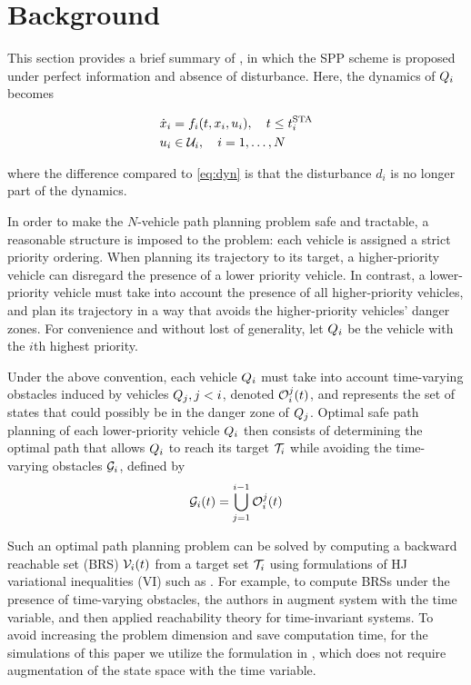 \section{Background \label{sec:background}}
This section provides a brief summary of \cite{Chen15}, in which the SPP scheme is proposed under perfect information and absence of disturbance. Here, the dynamics of $Q_i$ becomes

\begin{equation}
\label{eq:dyn_no_dstb}
\begin{aligned}
\dot{x}_i &= f_i(t, x_i, u_i), \quad t \le t^\text{STA}_i \\
u_i &\in \mathcal{U}_i, \quad i = 1,\ldots, N
\end{aligned}
\end{equation}

\noindent where the difference compared to \eqref{eq:dyn} is that the disturbance $d_i$ is no longer part of the dynamics.

In order to make the $N$-vehicle path planning problem safe and tractable, a reasonable structure is imposed to the problem: each vehicle is assigned a strict priority ordering. When planning its trajectory to its target, a higher-priority vehicle can disregard the presence of a lower priority vehicle. In contrast, a lower-priority vehicle must take into account the presence of all higher-priority vehicles, and plan its trajectory in a way that avoids the higher-priority vehicles' danger zones. For convenience and without lost of generality, let $Q_i$ be the vehicle with the $i$th highest priority. 

Under the above convention, each vehicle $Q_i$ must take into account time-varying obstacles induced by vehicles $Q_j, j<i$, denoted $\mathcal{O}_i^j(t)$, and represents the set of states that could possibly be in the danger zone of $Q_j$. Optimal safe path planning of each lower-priority vehicle $Q_i$ then consists of determining the optimal path that allows $Q_i$ to reach its target $\mathcal{T}_i$ while avoiding the time-varying obstacles $\mathcal{G}_i$, defined by
\vspace{-1em}
\begin{equation}
\label{eq:ioset}
\mathcal{G}_i(t) = \bigcup_{j=1}^{i-1}\mathcal{O}_i^j(t)
\end{equation}

Such an optimal path planning problem can be solved by computing a backward reachable set (BRS) $\mathcal{V}_i(t)$ from a target set $\mathcal{T}_i$ using formulations of HJ variational inequalities (VI) such as \cite{Barron90, Bokanowski10, Bokanowski11, Fisac15}. For example, to compute BRSs under the presence of time-varying obstacles, the authors in \cite{Bokanowski11} augment system with the time variable, and then applied reachability theory for time-invariant systems. To avoid increasing the problem dimension and save computation time, for the simulations of this paper we utilize the formulation in \cite{Fisac15}, which does not require augmentation of the state space with the time variable.

